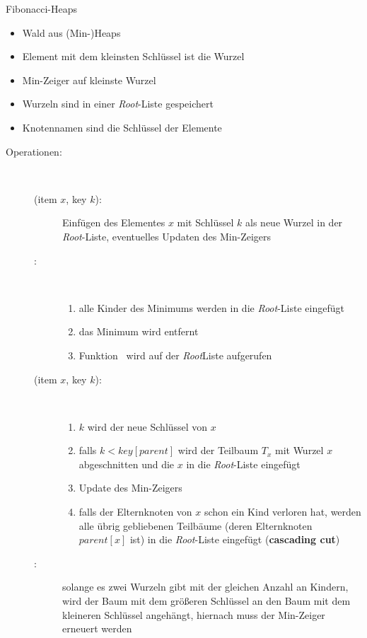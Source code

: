 \begin{TOP}{Fibonacci-Heaps}
\up\up\begin{itemize}
	\item Wald aus (Min-)Heaps
	\item Element mit dem kleinsten Schlüssel ist die Wurzel
	\item Min-Zeiger auf kleinste Wurzel
	\item Wurzeln sind in einer \textit{Root}-Liste gespeichert
	\item Knotennamen sind die Schlüssel der Elemente
\end{itemize}

\begin{description}
	\item[Operationen:]\ \\\up
	\begin{description}
		\item[\insert(item $x$, key $k$):] Einfügen des Elementes $x$ mit Schlüssel $k$ als neue Wurzel in der \textit{Root}-Liste, eventuelles Updaten des Min-Zeigers
		\item[\exMin:]\ \\\up
			\begin{enumerate}
				\item alle Kinder des Minimums werden in die \textit{Root}-Liste eingefügt
				\item das Minimum wird entfernt
				\item Funktion \cons~wird auf der \textit{Root}Liste aufgerufen
			\end{enumerate}
		\item[\decKey(item $x$, key $k$):] \ \\\up
			\begin{enumerate}
				\item $k$ wird der neue Schlüssel von $x$
				\item falls $k<key[parent]$ wird der Teilbaum $T_x$ mit Wurzel $x$ abgeschnitten und die $x$ in die \textit{Root}-Liste eingefügt
				\item Update des Min-Zeigers
				\item falls der Elternknoten von $x$ schon ein Kind verloren hat, werden alle übrig gebliebenen Teilbäume (deren Elternknoten $parent[x]$ ist) in die \textit{Root}-Liste eingefügt (\textbf{cascading cut})
			\end{enumerate}
		\item[\cons:] solange es zwei Wurzeln gibt mit der gleichen Anzahl an Kindern, wird der Baum mit dem größeren Schlüssel an den Baum mit dem kleineren Schlüssel angehängt, hiernach muss der Min-Zeiger erneuert werden\\
	\end{description}
\end{description}
\end{TOP}